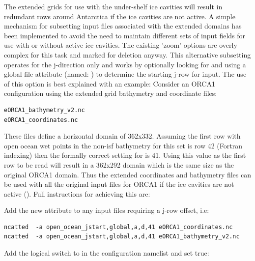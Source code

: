 The extended grids for use with the under-shelf ice cavities will result in redundant rows
around Antarctica if the ice cavities are not active. A simple mechanism for subsetting
input files associated with the extended domains has been implemented to avoid the need to
maintain different sets of input fields for use with or without active ice cavities. The
existing 'zoom' options are overly complex for this task and marked for deletion anyway.
This alternative subsetting operates for the j-direction only and works by optionally
looking for and using a global file attribute (named: ) to
determine the starting j-row for input. The use of this option is best explained with an
example: Consider an ORCA1 configuration using the extended grid bathymetry and coordinate
files:
\vspace{-10pt}
\begin{alltt}
\tiny
\begin{verbatim}
eORCA1_bathymetry_v2.nc
eORCA1_coordinates.nc
\end{verbatim}
\end{alltt}
\noindent These files define a horizontal domain of 362x332. Assuming the first row with
open ocean wet points in the non-isf bathymetry for this set is row 42 (Fortran indexing)
then the formally correct setting for  is 41. Using this value as the
first row to be read will result in a 362x292 domain which is the same size as the original
ORCA1 domain. Thus the extended coordinates and bathymetry files can be used with all the
original input files for ORCA1 if the ice cavities are not active (). Full instructions for achieving this are:

\noindent Add the new attribute to any input files requiring a j-row offset, i.e:
\vspace{-10pt}
\begin{alltt}
\tiny
\begin{verbatim}
ncatted  -a open_ocean_jstart,global,a,d,41 eORCA1_coordinates.nc 
ncatted  -a open_ocean_jstart,global,a,d,41 eORCA1_bathymetry_v2.nc
\end{verbatim}
\end{alltt}
 
\noindent Add the logical switch to  in the configuration namelist and set true:

